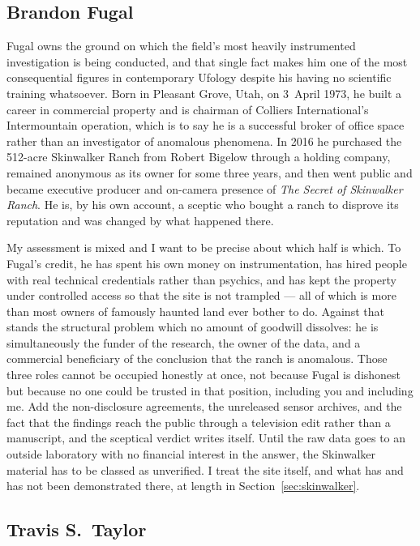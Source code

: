 \subsection{Brandon Fugal}

Fugal owns the ground on which the field's most heavily instrumented investigation is
being conducted, and that single fact makes him one of the most consequential figures in
contemporary Ufology despite his having no scientific training whatsoever. Born in
Pleasant Grove, Utah, on 3~April 1973, he built a career in commercial property and is
chairman of Colliers International's Intermountain operation, which is to say he is a
successful broker of office space rather than an investigator of anomalous phenomena. In
2016 he purchased the 512-acre Skinwalker Ranch from Robert Bigelow through a holding
company, remained anonymous as its owner for some three years, and then went public and
became executive producer and on-camera presence of \emph{The Secret of Skinwalker
Ranch}. He is, by his own account, a sceptic who bought a ranch to disprove its
reputation and was changed by what happened there.

My assessment is mixed and I want to be precise about which half is which. To Fugal's
credit, he has spent his own money on instrumentation, has hired people with real
technical credentials rather than psychics, and has kept the property under controlled
access so that the site is not trampled --- all of which is more than most owners of
famously haunted land ever bother to do. Against that stands the structural problem
which no amount of goodwill dissolves: he is simultaneously the funder of the research,
the owner of the data, and a commercial beneficiary of the conclusion that the ranch is
anomalous. Those three roles cannot be occupied honestly at once, not because Fugal is
dishonest but because no one could be trusted in that position, including you and
including me. Add the non-disclosure agreements, the unreleased sensor archives, and the
fact that the findings reach the public through a television edit rather than a
manuscript, and the sceptical verdict writes itself. Until the raw data goes to an
outside laboratory with no financial interest in the answer, the Skinwalker material has
to be classed as unverified. I treat the site itself, and what has and has not been
demonstrated there, at length in Section~\ref{sec:skinwalker}.

\subsection{Travis S.~Taylor}

